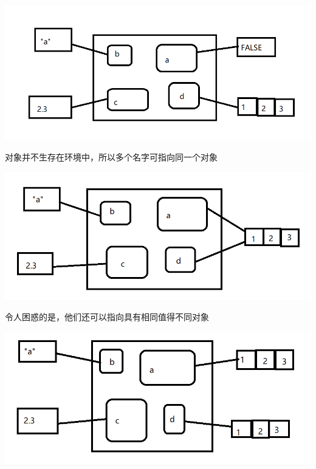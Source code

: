 \documentclass[]{book}
\newenvironment{Shaded}{\begin{snugshade}}{\end{snugshade}}
\newcommand{\DecValTok}[1]{\textcolor[rgb]{0.00,0.00,0.81}{#1}}
\newcommand{\StringTok}[1]{\textcolor[rgb]{0.31,0.60,0.02}{#1}}
\newcommand{\OperatorTok}[1]{\textcolor[rgb]{0.81,0.36,0.00}{\textbf{#1}}}
\newcommand{\NormalTok}[1]{#1}
\begin{document}
\begin{center}\includegraphics{img/ch7-2} \end{center}

对象并不生存在环境中，所以多个名字可指向同一个对象

\begin{Shaded}
\end{Shaded}

\begin{center}\includegraphics{img/ch7-3} \end{center}

令人困惑的是，他们还可以指向具有相同值得不同对象

\begin{Shaded}
\end{Shaded}

\begin{center}\includegraphics{img/ch7-4} \end{center}
\end{document}
